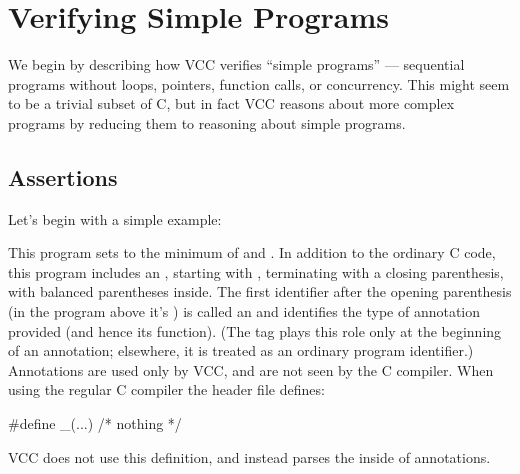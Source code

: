 \section{Verifying Simple Programs}
We begin by describing how VCC verifies ``simple programs'' ---
sequential programs without loops, pointers,  function calls, or concurrency. This
might seem to be a trivial subset of C, but in fact VCC reasons about
more complex programs by reducing them to reasoning about simple programs.

\subsection{Assertions}
\label{sect:assert-assume}


Let's begin with a simple example:

This program sets  to the minimum of  and
. In addition to the ordinary C code, this program includes an
, starting with \vcc{_(}, terminating with a closing
parenthesis, with balanced parentheses inside. The first identifier
after the opening parenthesis (in the program above it's )
is called an  and
identifies the type of annotation provided (and hence its function).
(The tag plays this role only 
at the beginning of an annotation; elsewhere, it is treated as
an ordinary program identifier.)
Annotations are used only by VCC, and are not seen by the C compiler.
When using the regular C compiler the  header file defines:
\begin{VCC}
#define _(...) /* nothing */
\end{VCC}
VCC does not use this definition, and instead parses the inside of 
annotations.


